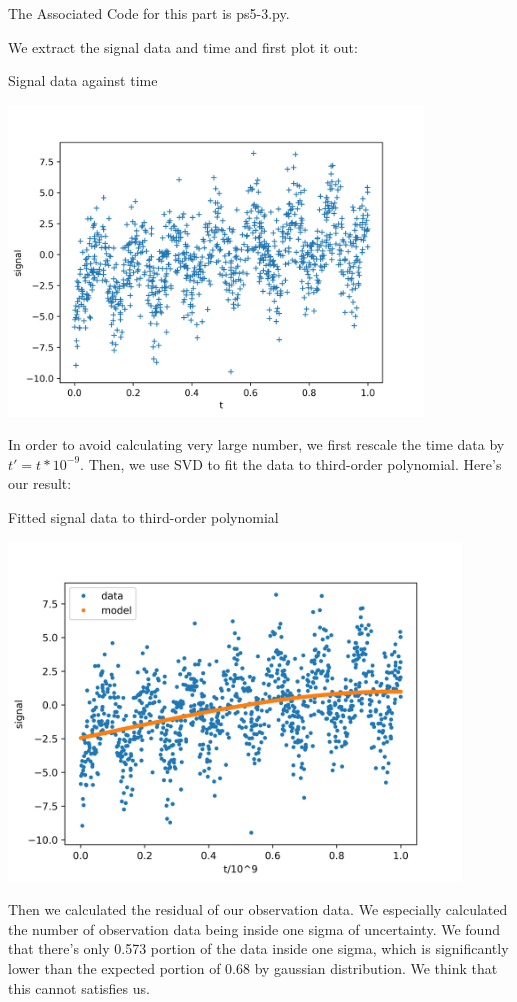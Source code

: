 \documentclass[letterpaper,12pt]{article}
\begin{document}
The Associated Code for this part is ps5-3.py.

We extract the signal data and time and first plot it out:

\begin{table}[!h]
    \centering
    \caption{Signal data against time}
    \includegraphics[width=11cm]{ps5-3-1.png}
\end{table}%

In order to avoid calculating very large number, we first rescale the time data by $t' = t*10^{-9}$. Then, we use SVD to fit the data to third-order polynomial. Here's our result:

\begin{table}[!h]
    \centering
    \caption{Fitted signal data to third-order polynomial}
    \includegraphics[width=12cm]{ps5-3-2.png}
\end{table}%

Then we calculated the residual of our observation data. We especially calculated the number of observation data being inside one sigma of uncertainty. We found that there's only 0.573 portion of the data inside one sigma, which is significantly lower than the expected portion of 0.68 by gaussian distribution. We think that this cannot satisfies us.
\end{document}
